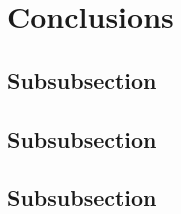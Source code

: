 \section{Conclusions}
\label{sec71}


\lipsum[1]

\subsection{Subsubsection}
\label{sec711}

\lipsum[1]

\subsection{Subsubsection}
\label{sec712}

\lipsum[1]

\subsection{Subsubsection}
\label{sec713}

\lipsum[1]
